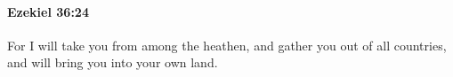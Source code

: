 
		\paragraph{Ezekiel 36:24} %
			\label{EZEKIEL-36-24}

			For I will take you from among the heathen, and gather you out of all countries, and will bring you into your own land.


